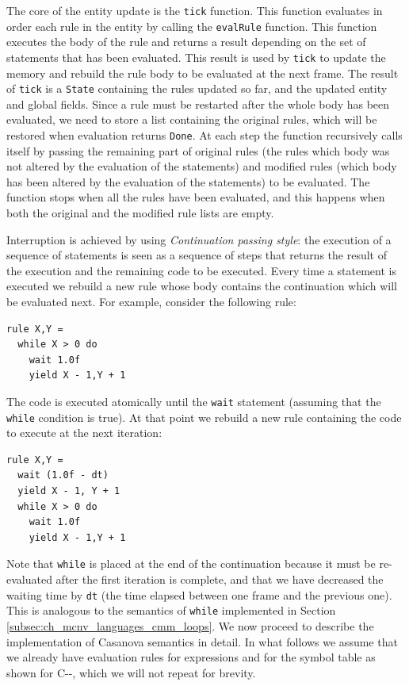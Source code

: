 The core of the entity update is the \texttt{tick} function. This function evaluates in order each rule in the entity by calling the \texttt{evalRule} function. This function executes the body of the rule and returns a result depending on the set of statements that has been evaluated. This result is used by \texttt{tick} to update the memory and rebuild the rule body to be evaluated at the next frame. The result of \texttt{tick} is a \texttt{State} containing the rules updated so far, and the updated entity and global fields. Since a rule must be restarted after the whole body has been evaluated, we need to store a list containing the original rules, which will be restored when evaluation returns \texttt{Done}. At each step the function recursively calls itself by passing the remaining part of original rules (the rules which body was not altered by the evaluation of the statements) and modified rules (which body has been altered by the evaluation of the statements) to be evaluated. The function stops when all the rules have been evaluated, and this happens when both the original and the modified rule lists are empty.

Interruption is achieved by using \textit{Continuation passing style}: the execution of a sequence of statements is seen as a sequence of steps that returns the result of the execution and the remaining code to be executed. Every time a statement is executed we rebuild a new rule whose body contains the continuation which will be evaluated next. For example, consider the following rule:

\begin{lstlisting}
rule X,Y =
  while X > 0 do
    wait 1.0f
    yield X - 1,Y + 1
\end{lstlisting}

\noindent
The code is executed atomically until the \texttt{wait} statement (assuming that the \texttt{while} condition is true). At that point we rebuild a new rule containing the code to execute at the next iteration:

\begin{lstlisting}
rule X,Y =
  wait (1.0f - dt)
  yield X - 1, Y + 1
  while X > 0 do
    wait 1.0f
    yield X - 1,Y + 1
\end{lstlisting}
Note that \texttt{while} is placed at the end of the continuation because it must be re-evaluated after the first iteration is complete, and that we have decreased the waiting time by \texttt{dt} (the time elapsed between one frame and the previous one). This is analogous to the semantics of \texttt{while} implemented in Section \ref{subsec:ch_mcnv_languages_cmm_loops}. We now proceed to describe the implementation of Casanova semantics in detail. In what follows we assume that we already have evaluation rules for expressions and for the symbol table as shown for C-{}-, which we will not repeat for brevity.

